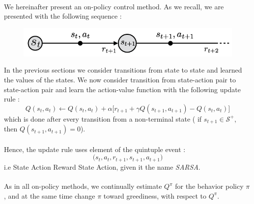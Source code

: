 \documentclass[a4paper]{article}
\begin{document}
{{{{					\paragraph{} We hereinafter present an on-policy control method. As we recall, we are presented with the following sequence : 
					\begin{figure}[h!]
						\begin{center}
							\includegraphics[width=0.5\linewidth]{rl_seq}
						\end{center}
					\end{figure}
					In the previous sections we consider transitions from state to state and learned the values of the states. We now consider transition from state-action pair to state-action pair and learn the action-value function with the following update rule : 
					\begin{equation}
						Q(s_t,a_t) \longleftarrow Q(s_t,a_t) + \alpha\big[ r_{t+1} + \gamma Q(s_{t+1},a_{t+1}) - Q(s_t,a_t) \big]
					\end{equation}
					which is done after every transition from a non-terminal state ( if $s_{t+1}\in\mathcal{S}^+$, then $Q(s_{t+1},a_{t+1}) = 0$). 
					
					\paragraph{} Hence, the update rule uses element of the quintuple event : 
					\begin{equation}
						\big( s_t,a_t, r_{t+1}, s_{t+1}, a_{t+1}\big)
					\end{equation}
					i.e State Action Reward State Action, given it the name \emph{SARSA}. 
					
					\paragraph{} As in all on-policy methods, we continually estimate $Q^\pi$ for the behavior policy $\pi$, and at the same time change $\pi$ toward greediness, with respect to $Q^\pi$.  
					\vspace{10pt}
					
}}}}
\end{document}
